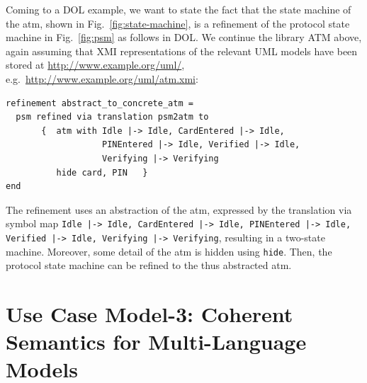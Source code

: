 \documentclass[10pt,fleqn,%
\ifpretendfinal
final%
\else
draft%
\fi,
]{scrreprt}
\newcommand*{\syntax}[1]{\texttt{#1}}
\newcommand{\uml}[1]{\textsf{#1}}
\begin{document}
Coming to a DOL example, we want to state the fact that the state
machine of the \uml{atm}, shown in Fig.~\ref{fig:state-machine}, is a
refinement of the protocol state machine in Fig.~\ref{fig:psm} as
follows in DOL.  We continue the library \uml{ATM} above, again
assuming that XMI representations of the relevant UML models have been
stored at \url{http://www.example.org/uml/},
e.g.\ \url{http://www.example.org/uml/atm.xmi}:

\begin{lstlisting}[basicstyle=\ttfamily,language=dolText,morekeywords={props,ObjectProperty,Class,DisjointUnionOf,SubClassOf,Characteristics,Transitive,Asymmetric,SubPropertyOf,DisjointClasses,EquivalentTo,inverse,only,forall,iff,if,or,exists,distributed,refinement,library,via},escapechar=@,mathescape]
refinement abstract_to_concrete_atm =
  psm refined via translation psm2atm to 
       {  atm with Idle |-> Idle, CardEntered |-> Idle, 
                   PINEntered |-> Idle, Verified |-> Idle, 
                   Verifying |-> Verifying 
          hide card, PIN   }
end
\end{lstlisting}

The refinement uses an abstraction of the \uml{atm}, expressed by the
translation via symbol map \texttt{Idle |-> Idle, CardEntered |-> Idle, PINEntered |-> Idle, Verified |-> Idle, Verifying |-> Verifying}, resulting in a two-state machine. Moreover, some detail of the \uml{atm} is hidden using
\syntax{hide}. Then, the protocol state machine can be refined to
the thus abstracted \uml{atm}.

\section{Use Case Model-3: Coherent Semantics for Multi-Language Models}
\label{model-3}
	
\end{document}
